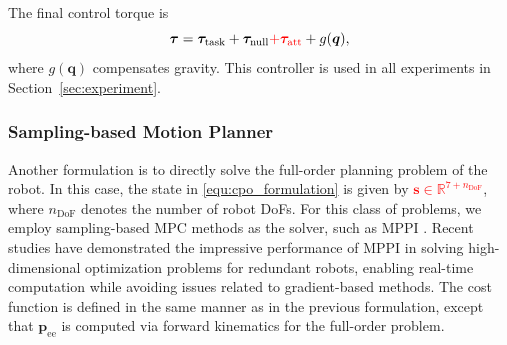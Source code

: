  The final control torque is
\begin{equation}
\boldsymbol{\tau}=\boldsymbol{\tau}_{\text{task}}+\boldsymbol{\tau}_{\text{null}}\textcolor{red}{+\boldsymbol{\tau}_{\mathrm{att}}}+g(\boldsymbol{q}),
\end{equation}
\noindent where $g(\boldsymbol{q})$ compensates gravity. This controller is used in all experiments in Section~\ref{sec:experiment}.

\subsubsection{Sampling-based Motion Planner}

Another formulation is to directly solve the full-order planning problem of the robot. In this case, the state in \eqref{equ:cpo_formulation} is given by \textcolor{red}{$\boldsymbol{s} \in \mathbb{R}^{7 + n_{\text{DoF}}}$}, where $n_{\text{DoF}}$ denotes the number of robot DoFs. For this class of problems, we employ sampling-based MPC methods as the solver, such as MPPI \cite{williams2015model}. Recent studies have demonstrated the impressive performance of MPPI in solving high-dimensional optimization problems for redundant robots, enabling real-time computation while avoiding issues related to gradient-based methods. The cost function is defined in the same manner as in the previous formulation, except that $\boldsymbol{p}_{\text{ee}}$ is computed via forward kinematics for the full-order problem.
